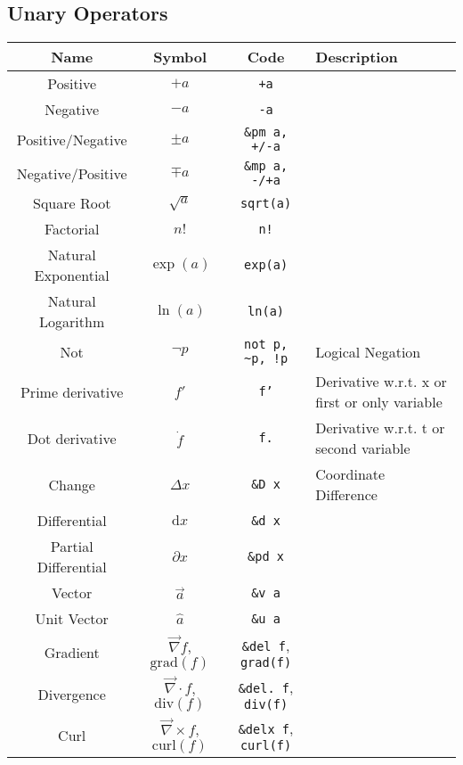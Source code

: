 \documentclass{article}
\begin{document}
  \newpage

  \subsection{Unary Operators} %
  \label{sub:unary_ops}
  \begin{table}[!h]
    \centering
    \begin{tabular}{|c|c|c|l|}
      \hline
      \textbf{Name} & \textbf{Symbol} & \textbf{Code} & \textbf{Description} \\
      \hline\hline

      Positive & \( +a \) & \texttt{+a} & \\
      Negative & \( -a \) & \texttt{-a} & \\
      Positive/Negative & \( \pm a \) & \texttt{\&pm a, +/-a} & \\
      Negative/Positive & \( \mp a \) & \texttt{\&mp a, -/+a} & \\
      Square Root & \( \sqrt{a} \) & \texttt{sqrt(a)} & \\
      Factorial & \( n! \) & \texttt{n!} & \\
      Natural Exponential & \( \exp(a) \) & \texttt{exp(a)} & \\
      Natural Logarithm & \( \ln(a) \) & \texttt{ln(a)} & \\
      Not & \( \neg p \) & \texttt{not p, \~{}p, !p} & Logical Negation \\
      \hline
      Prime derivative & \( f' \) & \texttt{f'} & Derivative w.r.t. x or first or only variable\\
      Dot derivative & \( \dot{f} \) & \texttt{f.} & Derivative w.r.t. t or second variable\\
      Change & \( \Delta x \) & \texttt{\&D x} & Coordinate Difference \\
      Differential & \( \mathrm{d}x \) & \texttt{\&d x} & \\
      Partial Differential & \( \partial x \) & \texttt{\&pd x} & \\
      Vector & \( \vec{a} \) & \texttt{\&v a} & \\
      Unit Vector & \( \hat{a} \) & \texttt{\&u a} & \\
      \hline
      Gradient & \( \vec{\nabla} f \), \( \mathrm{grad}(f) \) & \texttt{\&del f}, \texttt{grad(f)} & \\
      Divergence & \( \vec{\nabla} \cdot f \), \( \mathrm{div}(f) \) & \texttt{\&del.~f}, \texttt{div(f)} & \\
      Curl & \( \vec{\nabla} \times f \), \( \mathrm{curl}(f) \) & \texttt{\&delx f}, \texttt{curl(f)} & \\
      \hline
    \end{tabular}
  \end{table}
  
\end{document}
